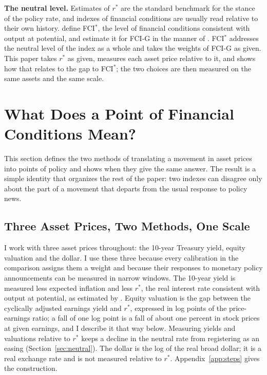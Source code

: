 \documentclass[11pt]{article}
\begin{document}
\textbf{The neutral level.} Estimates of $r^*$ \citep{laubach2003,holston2017,holston2023} are the standard benchmark for the stance of the policy rate, and indexes of financial conditions are usually read relative to their own history. \citet{caballero2026} define FCI$^*$, the level of financial conditions consistent with output at potential, and estimate it for FCI-G in the manner of \citet{laubach2003}. FCI$^*$ addresses the neutral level of the index as a whole and takes the weights of FCI-G as given. This paper takes $r^*$ as given, measures each asset price relative to it, and shows how that relates to the gap to FCI$^*$; the two choices are then measured on the same assets and the same scale.
\FloatBarrier

\section{What Does a Point of Financial Conditions Mean?}\label{sec:indexes}
This section defines the two methods of translating a movement in asset prices into points of policy and shows when they give the same answer. The result is a simple identity that organizes the rest of the paper: two indexes can disagree only about the part of a movement that departs from the usual response to policy news.

\subsection{Three Asset Prices, Two Methods, One Scale}\label{sec:meanings}
I work with three asset prices throughout: the 10-year Treasury yield, equity valuation and the dollar. I use these three because every calibration in the comparison assigns them a weight and because their responses to monetary policy announcements can be measured in narrow windows. The 10-year yield is measured less expected inflation and less $r^*$, the real interest rate consistent with output at potential, as estimated by \citet{laubach2003}. Equity valuation is the gap between the cyclically adjusted earnings yield and $r^*$, expressed in log points of the price-earnings ratio; a fall of one log point is a fall of about one percent in stock prices at given earnings, and I describe it that way below. Measuring yields and valuations relative to $r^*$ keeps a decline in the neutral rate from registering as an easing (Section~\ref{sec:neutral}). The dollar is the log of the real broad dollar; it is a real exchange rate and is not measured relative to $r^*$. Appendix~\ref{app:steps} gives the construction.
\end{document}

